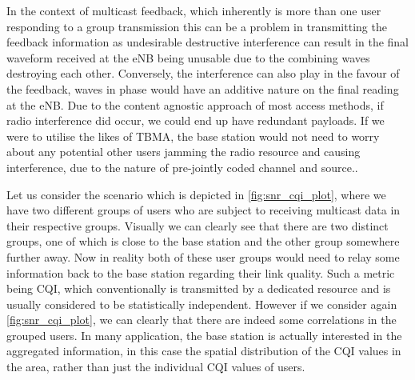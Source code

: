 \documentclass{article}
\begin{document}

In the context of multicast feedback, which inherently is more than one user responding to a group transmission this can be a problem in transmitting the feedback information as undesirable destructive interference can result in the final waveform received at the eNB being unusable due to the combining waves destroying each other. Conversely, the interference can also play in the favour of the feedback, waves in phase would have an additive nature on the final reading at the eNB. Due to the content agnostic approach of most access methods, if radio interference did occur, we could end up have redundant payloads. If we were to utilise the likes of \ac{TBMA}, the base station would not need to worry about any potential other users jamming the radio resource and causing interference, due to the nature of pre-jointly coded channel and source.. 

Let us consider the scenario which is depicted in \cref{fig:snr_cqi_plot}, where we have two different groups of users who are subject to receiving multicast data in their respective groups.  Visually we can clearly see that there are two distinct groups, one of which is close to the base station and the other group somewhere further away. Now in reality both of these user groups would need to relay some information back to the base station regarding their link quality. Such a metric being \ac{CQI}, which conventionally is transmitted by a dedicated resource and is usually considered to be statistically independent. However if we consider again \cref{fig:snr_cqi_plot}, we can clearly that there are indeed some correlations in the grouped users. In many application, the base station is actually interested in the aggregated information, in this case the spatial distribution of the CQI values in the area, rather than just the individual CQI values of users. 
\end{document}

